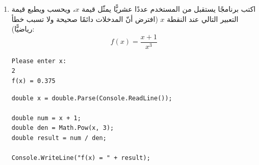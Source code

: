 \documentclass[14pt]{extarticle}
\begin{document}
\begin{enumerate}[itemsep=2em]
\begin{boxSolution}
\textbf{حل الفرع ب (أمثلة لإجابات صحيحة):}
\begin{itemize}[nosep]
    \item لطباعة $83$ مع $a > c$: يجب أن يكون $m = 8$ و $d = |a - b| = 3$، وبما أن $a > c$ فإن $a = 8$ و $b = 5$ و $c < 8$، مثل: $\text{num} = 852$.
    \item لطباعة $83$ مع $a < c$: يجب أن يكون $c = 8$ و $a < 8$ و $|a - b| = 3$، مثل: $\text{num} = 478$ (أو $528$).
    \item لطباعة $60$ بمنازل غير صفرية: يجب أن يكون $m = 6$ و $d = 0$ (أي $a = b$)، مثل: $\text{num} = 664$ (أو $336$).
    \item لطباعة $75$ مع $a < b$: يجب أن يكون $m = 7$ و $b - a = 5$، مثل: $\text{num} = 277$ (أو $387$ أو $497$).
\end{itemize}
\end{boxSolution}
\fi
\filbreak

\item
اكتب برنامجًا يستقبل من المستخدم عددًا عشريًّا يمثّل قيمة $x$، ويحسب ويطبع قيمة التعبير التالي عند النقطة $x$ (افترض أنّ المدخلات دائمًا صحيحة ولا تسبب خطأ رياضيًّا):
\[ f(x) = \frac{x + 1}{x^3} \]
\ifdetailed
\begin{boxExample}
\begin{english}
\begin{verbatim}
Please enter x:
2
f(x) = 0.375
\end{verbatim}
\end{english}
\end{boxExample}
\fi
\ifwithsols
\begin{boxSolution}
\begin{english}
\begin{verbatim}
double x = double.Parse(Console.ReadLine());

double num = x + 1;
double den = Math.Pow(x, 3);
double result = num / den;

Console.WriteLine("f(x) = " + result);
\end{verbatim}
\end{english}
\end{boxSolution}
\fi
\filbreak


\end{enumerate}
\end{document}
